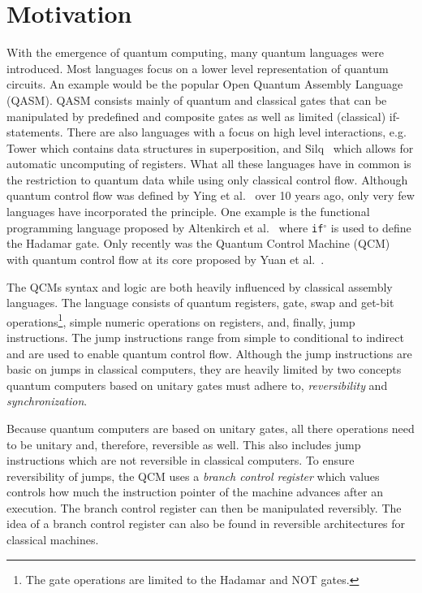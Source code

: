 \chapter{Motivation}
With the emergence of quantum computing, many quantum languages were introduced. Most languages focus on a lower level representation of quantum circuits. An example would be the popular Open Quantum Assembly Language (QASM)\cite{CBSG17}. QASM consists mainly of quantum and classical gates that can be manipulated by predefined and composite gates as well as limited (classical) if-statements. There are also languages with a focus on high level interactions, e.g. Tower\cite{ChMi22} which contains data structures in superposition, and Silq~\cite{BBGV20} which allows for automatic uncomputing of registers. What all these languages have in common is the restriction to quantum data while using only classical control flow. Although quantum control flow was defined by Ying et al.~\cite{YYF12} over 10 years ago, only very few languages have incorporated the principle. One example is the functional programming language proposed by Altenkirch et al.~\cite{AlGr05} where \texttt{if$^\circ$} is used to define the Hadamar gate. Only recently was the Quantum Control Machine (QCM) with quantum control flow at its core proposed by Yuan et al.~\cite{YVC24}. 

The QCMs syntax and logic are both heavily influenced by classical assembly languages. The language consists of quantum registers, gate, swap and get-bit operations\footnote{The gate operations are limited to the Hadamar and NOT gates.}, simple numeric operations on registers, and, finally, jump instructions. The jump instructions range from simple to conditional to indirect and are used to enable quantum control flow. Although the jump instructions are basic on jumps in classical computers, they are heavily limited by two concepts quantum computers based on unitary gates must adhere to, \emph{reversibility} and \emph{synchronization}.~\cite{YVC24}

Because quantum computers are based on unitary gates, all there operations need to be unitary and, therefore, reversible as well. This also includes jump instructions which are not reversible in classical computers. To ensure reversibility of jumps, the QCM uses a \emph{branch control register} which values controls how much the instruction pointer of the machine advances after an execution. The branch control register can then be manipulated reversibly. The idea of a branch control register can also be found in reversible architectures for classical machines\cite{AGY07, TAG12}.


